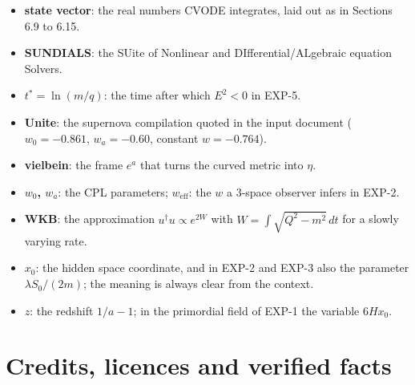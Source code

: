 \documentclass[11pt]{article}
\begin{document}
\begin{itemize}
\item \textbf{state vector}: the real numbers CVODE integrates, laid out as in Sections 6.9 to 6.15.
\item \textbf{SUNDIALS}: the SUite of Nonlinear and DIfferential/ALgebraic equation Solvers.
\item \textbf{$t^*=\ln(m/q)$}: the time after which $E^2<0$ in EXP-5.
\item \textbf{Unite}: the supernova compilation quoted in the input document ($w_0=-0.861$, $w_a=-0.60$, constant $w=-0.764$).
\item \textbf{vielbein}: the frame $e^a$ that turns the curved metric into $\eta$.
\item \textbf{$w_0$, $w_a$}: the CPL parameters; \textbf{$w_{\mathrm{eff}}$}: the $w$ a 3-space observer infers in EXP-2.
\item \textbf{WKB}: the approximation $u^\dagger u\propto e^{2W}$ with $W=\int\sqrt{Q^2-m^2}\,dt$ for a slowly varying rate.
\item \textbf{$x_0$}: the hidden space coordinate, and in EXP-2 and EXP-3 also the parameter $\lambda S_0/(2m)$; the meaning is always clear from the context.
\item \textbf{$z$}: the redshift $1/a-1$; in the primordial field of EXP-1 the variable $6Hx_0$.
\end{itemize}

\section{Credits, licences and verified facts}
\end{document}
